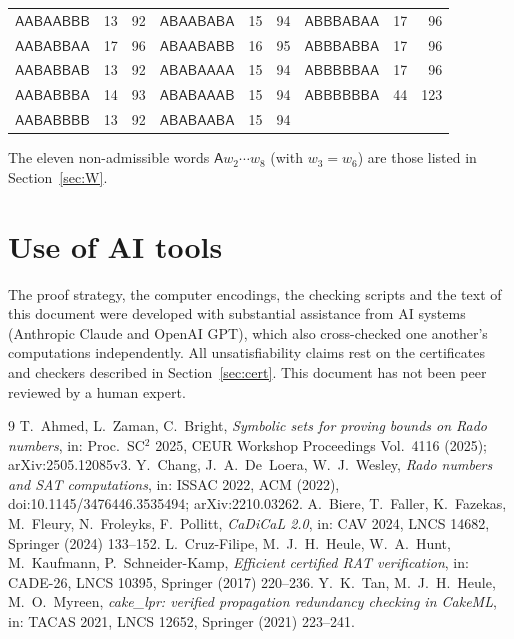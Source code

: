 \documentclass[11pt]{amsart}
\theoremstyle{definition}
\theoremstyle{remark}
\newcommand{\cA}{\mathsf{A}}\newcommand{\cB}{\mathsf{B}}\newcommand{\cC}{\mathsf{C}}
\begin{document}
\begin{center}
{\begin{tabular}{lrr@{\qquad}lrr@{\qquad}lrr}
$\cA\cA\cB\cA\cA\cB\cB\cB$ & 13 & 92 & $\cA\cB\cA\cA\cB\cA\cB\cA$ & 15 & 94 & $\cA\cB\cB\cB\cA\cB\cA\cA$ & 17 & 96\\
$\cA\cA\cB\cA\cB\cB\cA\cA$ & 17 & 96 & $\cA\cB\cA\cA\cB\cA\cB\cB$ & 16 & 95 & $\cA\cB\cB\cB\cA\cB\cB\cA$ & 17 & 96\\
$\cA\cA\cB\cA\cB\cB\cA\cB$ & 13 & 92 & $\cA\cB\cA\cB\cA\cA\cA\cA$ & 15 & 94 & $\cA\cB\cB\cB\cB\cB\cA\cA$ & 17 & 96\\
$\cA\cA\cB\cA\cB\cB\cB\cA$ & 14 & 93 & $\cA\cB\cA\cB\cA\cA\cA\cB$ & 15 & 94 & $\cA\cB\cB\cB\cB\cB\cB\cA$ & 44 & 123\\
$\cA\cA\cB\cA\cB\cB\cB\cB$ & 13 & 92 & $\cA\cB\cA\cB\cA\cA\cB\cA$ & 15 & 94 & & &\\
\bottomrule
\end{tabular}}
\end{center}
The eleven non-admissible words $\cA w_2\cdots w_8$ (with $w_3=w_6$) are those listed in Section~\ref{sec:W}.

\section*{Use of AI tools}
The proof strategy, the computer encodings, the checking scripts and the text of this document were developed with
substantial assistance from AI systems (Anthropic Claude and OpenAI GPT), which also cross-checked one another's
computations independently. All unsatisfiability claims rest on the certificates and checkers described in
Section~\ref{sec:cert}. This document has not been peer reviewed by a human expert.

\begin{thebibliography}{9}
 T.~Ahmed, L.~Zaman, C.~Bright, \emph{Symbolic sets for proving bounds on Rado numbers}, in: Proc.\ SC$^2$
2025, CEUR Workshop Proceedings Vol.~4116 (2025); arXiv:2505.12085v3.
 Y.~Chang, J.~A.~De~Loera, W.~J.~Wesley, \emph{Rado numbers and SAT computations}, in: ISSAC 2022,
ACM (2022), doi:10.1145/3476446.3535494; arXiv:2210.03262.
 A.~Biere, T.~Faller, K.~Fazekas, M.~Fleury, N.~Froleyks, F.~Pollitt, \emph{CaDiCaL 2.0}, in: CAV 2024,
LNCS 14682, Springer (2024) 133--152.
 L.~Cruz-Filipe, M.~J.~H.~Heule, W.~A.~Hunt, M.~Kaufmann, P.~Schneider-Kamp, \emph{Efficient certified
RAT verification}, in: CADE-26, LNCS 10395, Springer (2017) 220--236.
 Y.~K.~Tan, M.~J.~H.~Heule, M.~O.~Myreen, \emph{cake\_lpr: verified propagation redundancy checking in
CakeML}, in: TACAS 2021, LNCS 12652, Springer (2021) 223--241.
\end{thebibliography}
\end{document}
